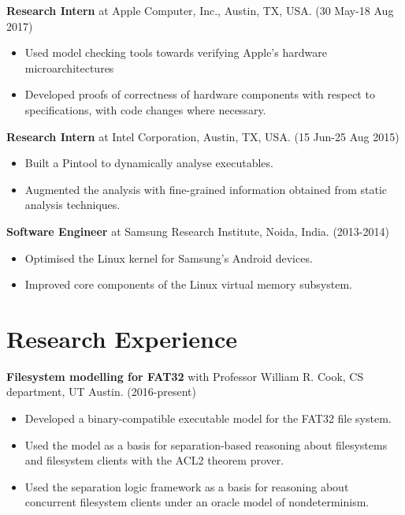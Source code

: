 \documentclass[margin]{res}
\begin{document}
\begin{resume}
 {\bf Research Intern} at Apple Computer, Inc., Austin, TX,
 USA. \hfill (30 May-18 Aug 2017)
 \begin{itemize} \itemsep -2pt  %
 \item Used model checking tools towards verifying Apple's hardware microarchitectures
 \item Developed proofs of correctness of hardware components with
   respect to specifications, with code changes where necessary.
 \end{itemize}

 {\bf Research Intern} at Intel Corporation, Austin, TX, USA. \hfill
 (15 Jun-25 Aug 2015)
 \begin{itemize} \itemsep -2pt  %
 \item Built a Pintool to dynamically analyse executables.
 \item Augmented
   the analysis with fine-grained information obtained from static
   analysis techniques.
 \end{itemize}

 {\bf Software Engineer} at Samsung Research Institute, Noida, India. \hfill (2013-2014)
 \begin{itemize} \itemsep -2pt  %
 \item Optimised the Linux kernel for Samsung's
   Android devices.
 \item Improved core components of the Linux virtual memory subsystem.
 \end{itemize}

\section{Research Experience}

 {\bf Filesystem modelling for FAT32} with Professor William R. Cook, CS department, UT Austin. \hfill (2016-present)
 \begin{itemize} \itemsep -2pt  %
 \item Developed a binary-compatible executable model for the FAT32 file system.
 \item Used the model as a basis for separation-based reasoning about
   filesystems and filesystem clients with the ACL2 theorem prover.
 \item Used the separation logic framework as a basis for reasoning
   about concurrent filesystem clients under an oracle model of
   nondeterminism.
 \end{itemize}


\end{resume}
\end{document}
